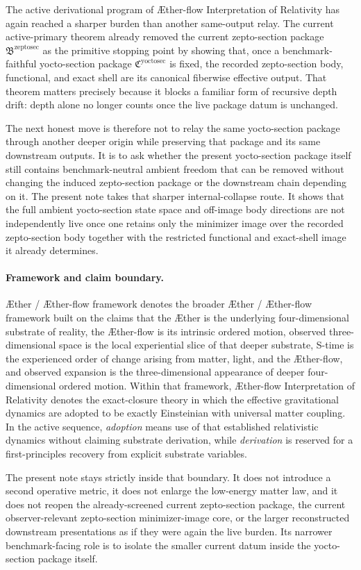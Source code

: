 \documentclass[11pt]{article}
\newcommand{\Aether}{\AE{}ther}
\newcommand{\Aflow}{\AE{}ther-flow}
\newcommand{\TheoryName}{\Aflow{} Interpretation of Relativity}
\newcommand{\TheoryProgram}{\Aether{} / \Aflow{} framework}
\newcommand{\ZeptoSectionPackage}{\mathfrak B^{\mathrm{zeptosec}}}
\newcommand{\YoctoSectionPackage}{\mathfrak C^{\mathrm{yoctosec}}}
\begin{document}
The active derivational program of \TheoryName{} has again reached a sharper burden than another same-output relay. The current active-primary theorem already removed the current zepto-section package \(\ZeptoSectionPackage\) as the primitive stopping point by showing that, once a benchmark-faithful yocto-section package \(\YoctoSectionPackage\) is fixed, the recorded zepto-section body, functional, and exact shell are its canonical fiberwise effective output. That theorem matters precisely because it blocks a familiar form of recursive depth drift: depth alone no longer counts once the live package datum is unchanged.

The next honest move is therefore not to relay the same yocto-section package through another deeper origin while preserving that package and its same downstream outputs. It is to ask whether the present yocto-section package itself still contains benchmark-neutral ambient freedom that can be removed without changing the induced zepto-section package or the downstream chain depending on it. The present note takes that sharper internal-collapse route. It shows that the full ambient yocto-section state space and off-image body directions are not independently live once one retains only the minimizer image over the recorded zepto-section body together with the restricted functional and exact-shell image it already determines.

\paragraph{Framework and claim boundary.}
\TheoryProgram{} denotes the broader \Aether{} / \Aflow{} framework built on the claims that the \Aether{} is the underlying four-dimensional substrate of reality, the \Aflow{} is its intrinsic ordered motion, observed three-dimensional space is the local experiential slice of that deeper substrate, S-time is the experienced order of change arising from matter, light, and the \Aflow{}, and observed expansion is the three-dimensional appearance of deeper four-dimensional ordered motion. Within that framework, \TheoryName{} denotes the exact-closure theory in which the effective gravitational dynamics are adopted to be exactly Einsteinian with universal matter coupling. In the active sequence, \emph{adoption} means use of that established relativistic dynamics without claiming substrate derivation, while \emph{derivation} is reserved for a first-principles recovery from explicit substrate variables.

The present note stays strictly inside that boundary. It does not introduce a second operative metric, it does not enlarge the low-energy matter law, and it does not reopen the already-screened current zepto-section package, the current observer-relevant zepto-section minimizer-image core, or the larger reconstructed downstream presentations as if they were again the live burden. Its narrower benchmark-facing role is to isolate the smaller current datum inside the yocto-section package itself.
\end{document}
